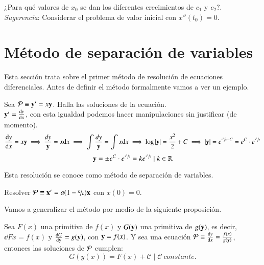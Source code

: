 \begin{th_ex}\label{thex:29/01-0}
    ¿Para qué valores de $x_0$ se dan los diferentes crecimientos de $c_1$ y $c_2$?.\\
    \textit{Sugerencia}: Considerar el problema de valor inicial con $x''(t_0) = 0$.
\end{th_ex}

\section{Método de separación de variables}
Esta sección trata sobre el primer método de resolución de ecuaciones diferenciales. Antes de definir el método formalmente vamos a ver un ejemplo.
\begin{eg}
    Sea $\P \equiv \mbf{y'} = x\mbf{y}$. Halla las soluciones de la ecuación.\\
    $\mbf{y'} = \dd{y}{x}$, con esta igualdad podemos hacer manipulaciones sin justificar (de momento).
    $$
        \dd{y}{x} = x \mbf{y} \implies \frac{dy}{\mbf{y}} = x\d x \implies \int \frac{dy}{\mbf{y}} = \int x\d x \implies \log|\mbf{y}| = \frac{x^2}{2} + C \implies |\mbf{y}| = e^{\sfrac{x^2}{2} + C} = e^C \cdot e^{\sfrac{x^2}{2}}
    $$
    $$
        \mbf{y} = \pm e^C \cdot e^{\sfrac{x^2}{2}} = ke^{\sfrac{x^2}{2}} \mid k \in \R
    $$
\end{eg}
Esta resolución se conoce como método de separación de variables.
\begin{th_ex}\label{thex:29/01-1}
    Resolver $\P \equiv \mbf{x'} = a(1-\sfrac{\mbf{x}}{L})\mbf{x}$ con $x(0)=0$.\\
\end{th_ex}
Vamos a generalizar el método por medio de la siguiente proposición.
\begin{pro}
    Sea $F(x)$ una primitiva de $f(x)$ y $G(\mbf{y})$ una primitiva de $g(\mbf{y})$, es decir, $\dd{F}{x} = f(x)$ y $\dd{G}{\mbf{y}} = g(\mbf{y})$, con $\mbf{y} = f(x)$. Y sea una ecuación $\P \equiv \dd{y}{x} = \frac{f(x)}{g(\mbf{y})}$, entonces las soluciones de $\P$ cumplen:
    $$
        G(y(x)) = F(x) + \mathcal{C} \mid \mathcal{C}\ constante.
    $$
\end{pro}

